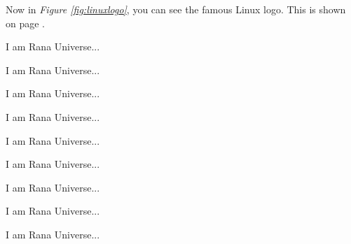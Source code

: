 \documentclass[12pt, letterpaper]{article}
\begin{document}
Now in \textit{Figure \ref{fig:linuxlogo}}, you can see the famous Linux logo.
This is shown on page \pageref{fig:linuxlogo}.





\vspace{10em}

I am Rana Universe...

I am Rana Universe...

I am Rana Universe...

I am Rana Universe...

I am Rana Universe...

I am Rana Universe...

I am Rana Universe...

I am Rana Universe...

I am Rana Universe...

\vspace{3em}





\lipsum[1]

\lipsum[2]

\vspace{1em}

\lipsum[1]




\end{document}
